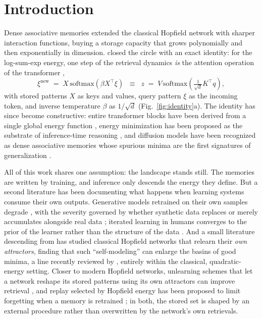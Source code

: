 \documentclass[preprint,12pt,authoryear]{elsarticle}
\begin{document}
\linenumbers

\section{Introduction}

Dense associative memories extended the classical Hopfield network
\citep{hopfield1982} with sharper interaction functions, buying a
storage capacity that grows polynomially \citep{krotov2016} and then
exponentially \citep{demircigil2017} in dimension. \citet{ramsauer2021}
closed the circle with an exact identity: for the log-sum-exp energy, one
step of the retrieval dynamics \emph{is} the attention operation of the
transformer \citep{vaswani2017},
\begin{equation}
\xi^{\mathrm{new}} \;=\; X\,\mathrm{softmax}\!\left(\beta X^{\top}\xi\right)
\;\;\equiv\;\;
z \;=\; V\,\mathrm{softmax}\!\left(\tfrac{1}{\sqrt{d}}K^{\top}q\right),
\label{eq:identity}
\end{equation}
with stored patterns $X$ as keys and values, query pattern $\xi$ as the
incoming token, and inverse temperature $\beta$ as $1/\sqrt{d}$
(Fig.~\ref{fig:identity}a). The identity has since become constructive:
entire transformer blocks have been derived from a single global energy
function \citep{hoover2023}, energy minimization has been proposed as the
substrate of inference-time reasoning \citep{gladstone2025}, and diffusion
models have been recognized as dense associative memories whose spurious
minima are the first signatures of generalization \citep{pham2025}.

All of this work shares one assumption: the landscape stands still. The
memories are written by training, and inference only descends the energy
they define. But a second literature has been documenting what happens when
learning systems consume their own outputs. Generative models retrained on
their own samples degrade \citep{shumailov2024, alemohammad2024}, with the
severity governed by whether synthetic data replaces or merely accumulates
alongside real data \citep{gerstgrasser2024, bertrand2024}; iterated
learning in humans converges to the prior of the learner rather than the
structure of the data \citep{griffiths2007}. And a small literature
descending from \citet{watson2011} has studied classical Hopfield networks
that relearn their \emph{own attractors}, finding that such
``self-modeling'' can enlarge the basins of good minima, a line recently
reviewed by \citet{froese2025}, entirely within the classical,
quadratic-energy setting. Closer to modern Hopfield networks, unlearning
schemes that let a network reshape its stored patterns using its own
attractors can improve retrieval \citep{serricchio2025}, and replay
selected by Hopfield energy has been proposed to limit forgetting when a
memory is retrained \citep{takeda2026}; in both, the stored set is shaped
by an external procedure rather than overwritten by the network's own
retrievals.
\end{document}
